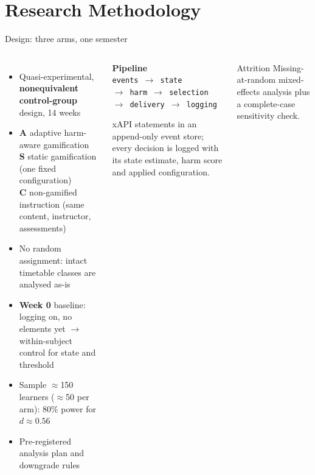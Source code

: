 \documentclass[10pt]{beamer}
\begin{document}
\section{Research Methodology}

\begin{frame}{Design: three arms, one semester}
\begin{columns}[T]
    \begin{itemize}
        \item Quasi-experimental, \textbf{nonequivalent control-group} design, 14 weeks
        \item \textbf{A} adaptive harm-aware gamification\\
        \textbf{S} static gamification (one fixed configuration)\\
        \textbf{C} non-gamified instruction (same content, instructor, assessments)
        \item No random assignment: intact timetable classes are analysed as-is
        \item \textbf{Week 0} baseline: logging on, no elements yet $\rightarrow$ within-subject
        control for state and threshold
        \item Sample $\approx$150 learners ($\approx$50 per arm): 80\% power for $d \approx 0.56$
        \item Pre-registered analysis plan and downgrade rules
    \end{itemize}
    \begin{keybox}\footnotesize
    \textbf{Pipeline}\\
    \texttt{events $\rightarrow$ state}\\
    \texttt{$\rightarrow$ harm $\rightarrow$ selection}\\
    \texttt{$\rightarrow$ delivery $\rightarrow$ logging}
    \vspace{2pt}

    xAPI statements in an append-only event store; every decision is logged with its state
    estimate, harm score and applied configuration.
    \end{keybox}
    \vspace{0.2cm}
    \begin{block}{Attrition}\small
    Missing-at-random mixed-effects analysis plus a complete-case sensitivity check.
    \end{block}
\end{columns}
\end{frame}
\end{document}
